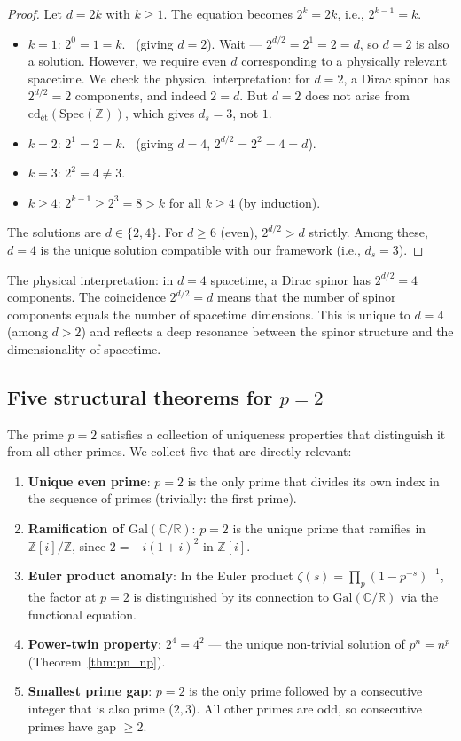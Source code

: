 \documentclass[12pt,a4paper]{article}
\theoremstyle{definition}
\newcommand{\Spec}{\mathrm{Spec}}
\newcommand{\Gal}{\mathrm{Gal}}
\newcommand{\cd}{\mathrm{cd}}
\newcommand{\ZZ}{\mathbb{Z}}
\newcommand{\RR}{\mathbb{R}}
\newcommand{\CC}{\mathbb{C}}
\begin{document}
\begin{proof}
Let $d = 2k$ with $k \geq 1$. The equation becomes $2^k = 2k$, i.e., $2^{k-1} = k$.
\begin{itemize}
  \item $k = 1$: $2^0 = 1 = k$. \checkmark \ (giving $d = 2$). Wait --- $2^{d/2} = 2^1 = 2 = d$, so $d=2$ is also a solution. However, we require even $d$ corresponding to a physically relevant spacetime. We check the physical interpretation: for $d=2$, a Dirac spinor has $2^{d/2} = 2$ components, and indeed $2 = d$. But $d=2$ does not arise from $\cd_{\text{\'et}}(\Spec(\ZZ))$, which gives $d_s = 3$, not $1$.
  \item $k = 2$: $2^1 = 2 = k$. \checkmark \ (giving $d = 4$, $2^{d/2} = 2^2 = 4 = d$).
  \item $k = 3$: $2^2 = 4 \neq 3$.
  \item $k \geq 4$: $2^{k-1} \geq 2^3 = 8 > k$ for all $k \geq 4$ (by induction).
\end{itemize}
The solutions are $d \in \{2, 4\}$. For $d \geq 6$ (even), $2^{d/2} > d$ strictly.
Among these, $d = 4$ is the unique solution compatible with our framework (i.e., $d_s = 3$).
\end{proof}

The physical interpretation: in $d=4$ spacetime, a Dirac spinor has
$2^{d/2} = 4$ components. The coincidence $2^{d/2} = d$ means that the number of
spinor components equals the number of spacetime dimensions. This is unique to $d=4$
(among $d > 2$) and reflects a deep resonance between the spinor structure and the
dimensionality of spacetime.

\subsection{Five structural theorems for $p=2$}

The prime $p=2$ satisfies a collection of uniqueness properties that distinguish it
from all other primes. We collect five that are directly relevant:

\begin{enumerate}
  \item \textbf{Unique even prime}: $p=2$ is the only prime that divides its own
    index in the sequence of primes (trivially: the first prime).
  \item \textbf{Ramification of $\Gal(\CC/\RR)$}: $p=2$ is the unique prime that
    ramifies in $\ZZ[i]/\ZZ$, since $2 = -i(1+i)^2$ in $\ZZ[i]$.
  \item \textbf{Euler product anomaly}: In the Euler product
    $\zeta(s) = \prod_p (1 - p^{-s})^{-1}$, the factor at $p=2$ is distinguished
    by its connection to $\Gal(\CC/\RR)$ via the functional equation.
  \item \textbf{Power-twin property}: $2^4 = 4^2$ --- the unique non-trivial solution
    of $p^n = n^p$ (Theorem~\ref{thm:pn_np}).
  \item \textbf{Smallest prime gap}: $p=2$ is the only prime followed by a consecutive
    integer that is also prime ($2, 3$). All other primes are odd, so consecutive
    primes have gap $\geq 2$.
\end{enumerate}
\end{document}
